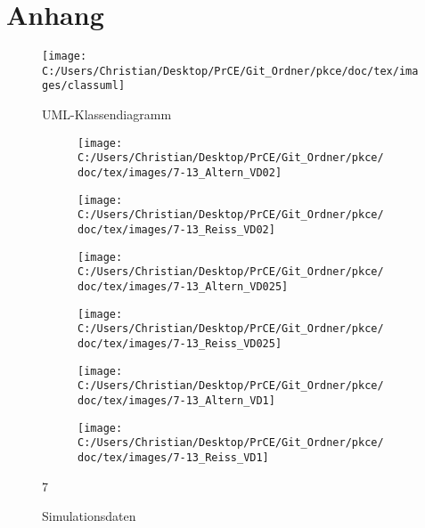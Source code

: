 \chapter{Anhang}

\begin{figure}
	\centering
	\texttt{[image: C:/Users/Christian/Desktop/PrCE/Git\_Ordner/pkce/doc/tex/images/classuml]}
	\caption{UML-Klassendiagramm}
	\label{fig:classuml}
\end{figure}

\begin{figure}
	
	\begin{subfigure}{0.5\linewidth}
		\centering
		\texttt{[image: C:/Users/Christian/Desktop/PrCE/Git\_Ordner/pkce/doc/tex/images/7-13\_Altern\_VD02]}
		\caption*{}
		\label{fig:7-13alternvd02}
	\end{subfigure}
	\begin{subfigure}{0.5\linewidth}
		\centering
		\texttt{[image: C:/Users/Christian/Desktop/PrCE/Git\_Ordner/pkce/doc/tex/images/7-13\_Reiss\_VD02]}
		\caption*{}
		\label{fig:7-13reissvd02}
	\end{subfigure}
	\begin{subfigure}{0.5\linewidth}
		\centering
		\texttt{[image: C:/Users/Christian/Desktop/PrCE/Git\_Ordner/pkce/doc/tex/images/7-13\_Altern\_VD025]}
		\caption*{}
		\label{fig:7-13alternvd025}
	\end{subfigure}
	\begin{subfigure}{0.5\linewidth}
		\centering
		\texttt{[image: C:/Users/Christian/Desktop/PrCE/Git\_Ordner/pkce/doc/tex/images/7-13\_Reiss\_VD025]}
		\caption*{}
		\label{fig:7-13reissvd025}
	\end{subfigure}
	\begin{subfigure}{0.5\linewidth}
		\centering
		\texttt{[image: C:/Users/Christian/Desktop/PrCE/Git\_Ordner/pkce/doc/tex/images/7-13\_Altern\_VD1]}
		\caption*{}
		\label{fig:7-13alternvd1}
	\end{subfigure}
	\begin{subfigure}{0.5\linewidth}
		\centering
		\texttt{[image: C:/Users/Christian/Desktop/PrCE/Git\_Ordner/pkce/doc/tex/images/7-13\_Reiss\_VD1]}
		\caption*{}
		\label{fig:7-13reissvd1}
	\end{subfigure}7
\caption{Simulationsdaten}
\label{simlutionsdaten}
\end{figure}